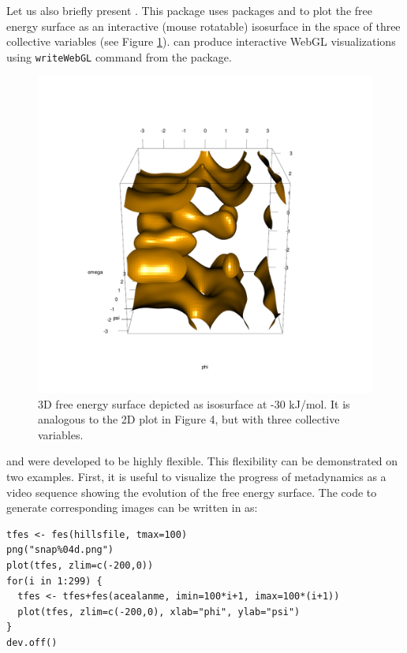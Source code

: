 Let us also briefly present . This package uses
packages  and  to plot the free energy
surface as an interactive (mouse rotatable) isosurface in the space of
three collective variables (see Figure \ref{fig:fes3d}).
 can produce interactive WebGL visualizations
using \texttt{writeWebGL} command from the  package.

\begin{Schunk}
\begin{figure}

{\centering \includegraphics[width=0.8\linewidth]{fig8} 

}

\caption[3D free energy surface depicted as isosurface at -30 kJ/mol]{3D free energy surface depicted as isosurface at -30 kJ/mol. It is analogous to the 2D plot in Figure 4, but with three collective variables.}\label{fig:fes3d}
\end{figure}
\end{Schunk}

 and  were developed to be
highly flexible. This flexibility can be demonstrated on two examples.
First, it is useful to visualize the progress of metadynamics as a video
sequence showing the evolution of the free energy surface. The code to
generate corresponding images can be written in 
as:

\begin{verbatim}
tfes <- fes(hillsfile, tmax=100)
png("snap%04d.png")
plot(tfes, zlim=c(-200,0))
for(i in 1:299) {
  tfes <- tfes+fes(acealanme, imin=100*i+1, imax=100*(i+1))
  plot(tfes, zlim=c(-200,0), xlab="phi", ylab="psi")
}
dev.off()
\end{verbatim}

